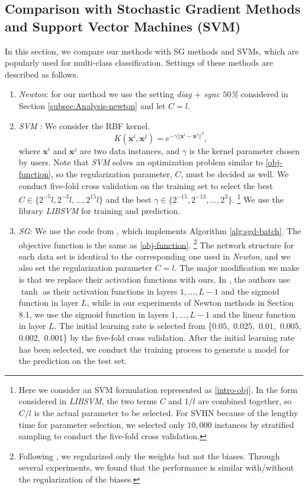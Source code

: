 \documentclass[12pt]{article}
\def\bx{{\boldsymbol x}}
\begin{document}
\subsection{Comparison with Stochastic Gradient Methods and Support Vector Machines (SVM)}
\label{subsec:multiclass}
In this section, we compare our methods with SG methods and SVMs, which are popularly used for multi-class classification.
Settings of these methods are described as follows.
\begin{enumerate}[1.]
\item
{\sl Newton}: for our method  we use the setting {\sl diag $+$ sync $50$\%} considered in Section \ref{subsec:Analysis-newton} and let $C = l$. 
\item
{\sl SVM} \citep{BB92a}: We consider the RBF kernel. 
\begin{equation*}
K(\bx^i,\bx^j) = e^{-\gamma||\bx^i-\bx^j||^2},
\end{equation*}
where $\bx^i$ and $\bx^j$ are two data instances, and $\gamma$ is the kernel parameter chosen by users. Note that {\sl SVM} solves an optimization problem similar to \eqref{obj-function}, so the regularization parameter, $C$, must be decided as well. We conduct five-fold cross validation on the training set to select the best $C \in \{2^{-5}l,2^{-3}l,\ldots,2^{15}l\}$ and the best $\gamma \in \{2^{-15},2^{-13},\ldots,2^{3}\}$.%
\footnote{Here we consider an SVM formulation represented as \eqref{intro-obj}. In the form considered in {\sl LIBSVM}, the two terms $C$ and $1/l$ are combined together, so $C/l$ is the actual parameter to be selected. For {\sf SVHN} because of the lengthy time for parameter selection, we selected only $10,000$ instances by stratified sampling to conduct the five-fold cross validation.} %
We use the library {\sl LIBSVM} \citep{CC01a} for training and prediction.
\item
{\sl SG}: We use the code from \cite{PB14a}, which implements Algorithm \ref{alg:sgd-batch}. %
The objective function is the same as \eqref{obj-function}.%
\footnote{Following \cite{PB14a}, we regularized only the weights but not the biases. Through several experiments, we found that the performance is similar with/without the regularization of the biases.} %
The network structure for each data set is identical to the corresponding one used in {\sl Newton}, and we also set the regularization parameter $C=l$. The major modification we make is that we replace their activation functions with ours. In \cite{PB14a}, the authors use $\tanh$ as their activation functions in layers $1,\ldots,L-1$ and the sigmoid function in layer $L$, while in our experiments of Newton methods in Section 8.1, we use the sigmoid function in layers $1,\ldots,L-1$ and the linear function in layer $L$. The initial learning rate is selected from \{$0.05,$ $0.025,$ $0.01,$ $0.005,$ $0.002,$ $0.001$\} by the five-fold cross validation. After the initial learning rate has been selected, we conduct the training process to generate a model for the prediction on the test set.
\end{enumerate}
\end{document}
